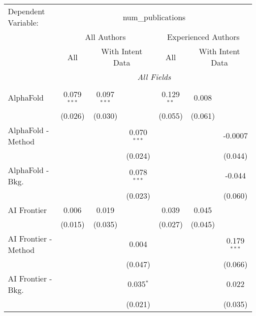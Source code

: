 \begingroup
\centering
\begin{tabular}{lcccccc}
   \tabularnewline \midrule \midrule
   Dependent Variable: & \multicolumn{6}{c}{num\_publications}\\
 & \multicolumn{3}{c}{All Authors} & \multicolumn{3}{c}{Experienced Authors} \\
\cmidrule(lr){2-4} \cmidrule(lr){5-7}
 & \multicolumn{1}{c}{All} & \multicolumn{2}{c}{With Intent Data} & \multicolumn{1}{c}{All} & \multicolumn{2}{c}{With Intent Data} \\
\cmidrule(lr){2-2} \cmidrule(lr){3-4} \cmidrule(lr){5-5} \cmidrule(lr){6-7}
 & \multicolumn{6}{c}{\textit{All Fields}} \\ \\
   AlphaFold            & 0.079$^{***}$ & 0.097$^{***}$ &               & 0.129$^{**}$  & 0.008        &   \\   
                        & (0.026)       & (0.030)       &               & (0.055)       & (0.061)      &   \\   
   AlphaFold - Method   &               &               & 0.070$^{***}$ &               &              & -0.0007\\   
                        &               &               & (0.024)       &               &              & (0.044)\\   
   AlphaFold - Bkg.     &               &               & 0.078$^{***}$ &               &              & -0.044\\   
                        &               &               & (0.023)       &               &              & (0.060)\\   
   AI Frontier          & 0.006         & 0.019         &               & 0.039         & 0.045        &   \\   
                        & (0.015)       & (0.035)       &               & (0.027)       & (0.045)      &   \\   
   AI Frontier - Method &               &               & 0.004         &               &              & 0.179$^{***}$\\   
                        &               &               & (0.047)       &               &              & (0.066)\\   
   AI Frontier - Bkg.   &               &               & 0.035$^{*}$   &               &              & 0.022\\   
                        &               &               & (0.021)       &               &              & (0.035)\\   

\end{tabular}
